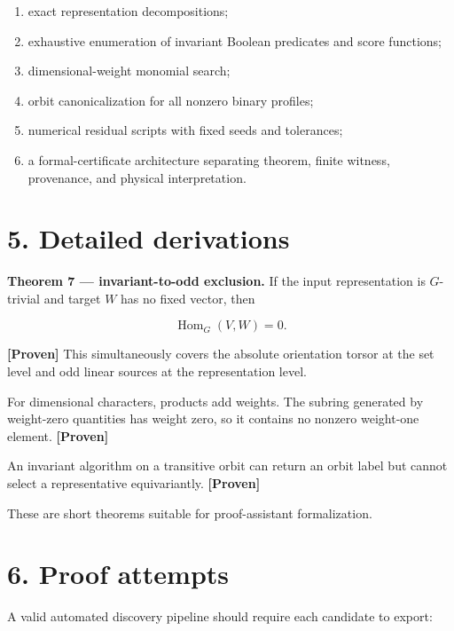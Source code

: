 \documentclass[11pt,a4paper,openany]{report}
\newcommand{\statusProven}{\textcolor{fingreen}{[Proven]}}
\begin{document}
\begin{enumerate}
\item 
exact representation decompositions;

\item 
exhaustive enumeration of invariant Boolean predicates and score functions;

\item 
dimensional-weight monomial search;

\item 
orbit canonicalization for all nonzero binary profiles;

\item 
numerical residual scripts with fixed seeds and tolerances;

\item 
a formal-certificate architecture separating theorem, finite witness, provenance, and physical interpretation.

\end{enumerate}

\section{5. Detailed derivations}

\textbf{Theorem 7 — invariant-to-odd exclusion.} If the input representation is \(G\)-trivial and target \(W\) has no fixed vector, then

\[
\operatorname{Hom}_G(V,W)=0.
\]

\textbf{\statusProven{}} This simultaneously covers the absolute orientation torsor at the set level and odd linear sources at the representation level.

For dimensional characters, products add weights. The subring generated by weight-zero quantities has weight zero, so it contains no nonzero weight-one element. \textbf{\statusProven{}}

An invariant algorithm on a transitive orbit can return an orbit label but cannot select a representative equivariantly. \textbf{\statusProven{}}

These are short theorems suitable for proof-assistant formalization.

\section{6. Proof attempts}

A valid automated discovery pipeline should require each candidate to export:
\end{document}
